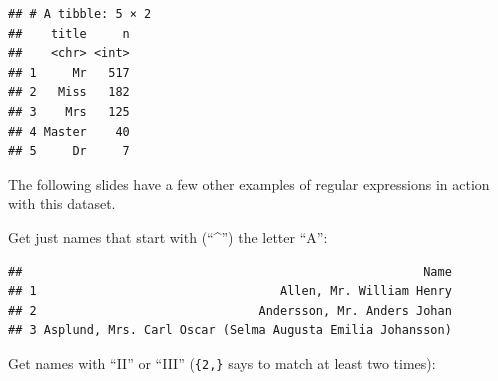 \documentclass[]{book}
\makeatletter
\newenvironment{Shaded}{\begin{snugshade}}{\end{snugshade}}
\newcommand{\KeywordTok}[1]{\textcolor[rgb]{0.13,0.29,0.53}{\textbf{{#1}}}}
\newcommand{\DataTypeTok}[1]{\textcolor[rgb]{0.13,0.29,0.53}{{#1}}}
\newcommand{\DecValTok}[1]{\textcolor[rgb]{0.00,0.00,0.81}{{#1}}}
\newcommand{\CharTok}[1]{\textcolor[rgb]{0.31,0.60,0.02}{{#1}}}
\newcommand{\StringTok}[1]{\textcolor[rgb]{0.31,0.60,0.02}{{#1}}}
\newcommand{\NormalTok}[1]{{#1}}
\newenvironment{kframe}{%
\medskip{}
\setlength{\fboxsep}{.8em}
 \def\at@end@of@kframe{}%
 \ifinner\ifhmode%
  \def\at@end@of@kframe{\end{minipage}}%
  \begin{minipage}{\columnwidth}%
 \fi\fi%
 \def\FrameCommand##1{\hskip\@totalleftmargin \hskip-\fboxsep
 \colorbox{shadecolor}{##1}\hskip-\fboxsep
     \hskip-\linewidth \hskip-\@totalleftmargin \hskip\columnwidth}%
 \MakeFramed {\advance\hsize-\width
   \@totalleftmargin\z@ \linewidth\hsize
   \@setminipage}}%
 {\par\unskip\endMakeFramed%
 \at@end@of@kframe}
\renewenvironment{Shaded}{\begin{kframe}}{\end{kframe}}
\makeatother
\begin{document}
\begin{Shaded}
\end{Shaded}

\begin{verbatim}
## # A tibble: 5 × 2
##    title     n
##    <chr> <int>
## 1     Mr   517
## 2   Miss   182
## 3    Mrs   125
## 4 Master    40
## 5     Dr     7
\end{verbatim}

The following slides have a few other examples of regular expressions in
action with this dataset. \bigskip

Get just names that start with (``\^{}'') the letter ``A'':

\begin{Shaded}
\end{Shaded}

\begin{verbatim}
##                                                        Name
## 1                                  Allen, Mr. William Henry
## 2                               Andersson, Mr. Anders Johan
## 3 Asplund, Mrs. Carl Oscar (Selma Augusta Emilia Johansson)
\end{verbatim}

Get names with ``II'' or ``III'' (\texttt{\{2,\}} says to match at least
two times):
\end{document}
